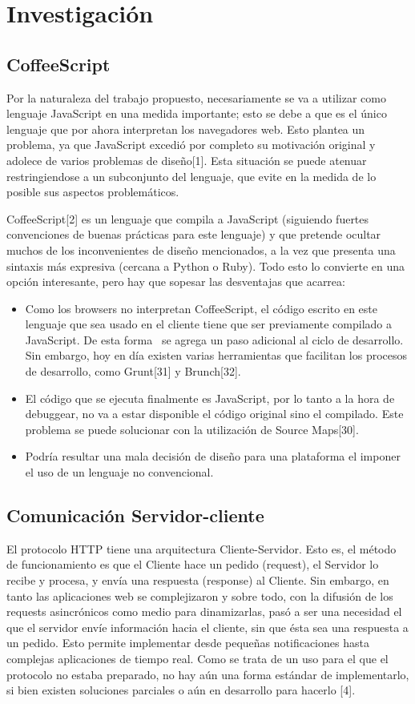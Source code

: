 \documentclass[doc,helv,longtable]{article}
\begin{document}
\section{Investigación}
\subsection{CoffeeScript}


Por la naturaleza del trabajo propuesto, necesariamente se va a utilizar como lenguaje JavaScript en una medida importante; esto se debe a que es el único lenguaje que por ahora interpretan los navegadores web. Esto plantea un problema, ya que JavaScript excedió por completo su motivación original y adolece de varios problemas de diseño[1]. Esta situación se puede atenuar restringiendose a un subconjunto del lenguaje, que evite en la medida de lo posible sus aspectos problemáticos.

CoffeeScript[2] es un lenguaje que compila a JavaScript (siguiendo fuertes convenciones de buenas prácticas para este lenguaje) y que pretende ocultar muchos de los inconvenientes de diseño mencionados, a la vez que presenta una sintaxis más expresiva (cercana a Python o Ruby). Todo esto lo convierte en una opción interesante, pero hay que sopesar las desventajas que acarrea: 
\begin{itemize}
\item  Como los browsers no interpretan CoffeeScript, el código escrito en este lenguaje que sea usado en el cliente tiene que ser previamente compilado a JavaScript. De esta forma  se agrega un paso adicional al ciclo de desarrollo. Sin embargo, hoy en día existen varias herramientas que facilitan los procesos de desarrollo, como Grunt[31] y Brunch[32].
\item  El código que se ejecuta finalmente es JavaScript, por lo tanto a la hora de debuggear, no va a estar disponible el código original sino el compilado. Este problema se puede solucionar con la utilización de Source Maps[30].
\item  Podría resultar una mala decisión de diseño para una plataforma el imponer el uso de un lenguaje no convencional. 

\end{itemize}
\subsection{Comunicación Servidor-cliente}


El protocolo HTTP tiene una arquitectura Cliente-Servidor. Esto es, el método de funcionamiento es que el Cliente hace un pedido (request), el Servidor lo recibe y procesa, y envía una respuesta (response) al Cliente. Sin embargo, en tanto las aplicaciones web se complejizaron y sobre todo, con la difusión de los requests asincrónicos como medio para dinamizarlas, pasó a ser una necesidad el que el servidor envíe información hacia el cliente, sin que ésta sea una respuesta a un pedido. Esto permite implementar desde pequeñas notificaciones hasta complejas aplicaciones de tiempo real. Como se trata de un uso para el que el protocolo no estaba preparado, no hay aún una forma estándar de implementarlo, si bien existen soluciones parciales o aún en desarrollo para hacerlo [4].
\end{document}
